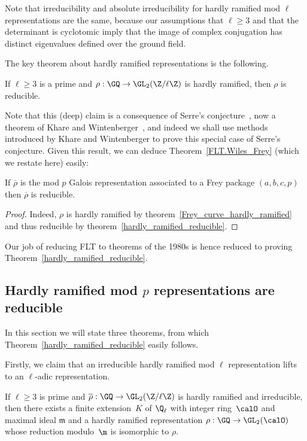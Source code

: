 Note that irreducibility and absolute irreducibility for hardly ramified mod $\ell$ representations
are the same, because our assumptions that $\ell\geq3$
and that the determinant is cyclotomic imply that the image of complex conjugation
has distinct eigenvalues defined over the ground field.

The key theorem about hardly ramified representations is the following.

\begin{theorem}
  \label{hardly_ramified_reducible}
  If $\ell\geq 3$ is a prime and $\rho:\GQ\to\GL_2(\Z/\ell\Z)$ is hardly ramified,
  then $\rho$ is reducible.
\end{theorem}

Note that this (deep) claim is a consequence of Serre's conjecture~\cite{serreconj},
now a theorem of Khare and Wintenberger~\cite{kwII}, and indeed we shall use
methods introduced by Khare and Wintenberger to prove this special case of
Serre's conjecture. Given this result, we can deduce Theorem~\ref{FLT.Wiles_Frey}
(which we restate here) easily:

\begin{theorem}
  \label{FLT.Wiles_Frey'}
  \leanok
  If $\overline{\rho}$ is the mod $p$ Galois representation associated to a Frey package $(a,b,c,p)$ then
  $\overline{\rho}$ is reducible.
\end{theorem}
\begin{proof}
  Indeed, $\rho$ is hardly ramified by theorem~\ref{Frey_curve_hardly_ramified}
  and thus reducible by theorem~\ref{hardly_ramified_reducible}.
\end{proof}

Our job of reducing FLT to theorems of the 1980s is hence reduced to proving
Theorem~\ref{hardly_ramified_reducible}.

\subsection{Hardly ramified mod $p$ representations are reducible}

In this section we will state three theorems, from which Theorem~\ref{hardly_ramified_reducible}
easily follows.

Firstly, we claim that
an irreducible hardly ramified mod $\ell$ representation lifts to an $\ell$-adic representation.

\begin{theorem}
  \label{hardly-ramified-lifts}
  If $\ell\geq3$ is prime and $\overline{\rho}:\GQ\to\GL_2(\Z/\ell\Z)$
  is hardly ramified and irreducible, then there exists a finite extension~$K$ of $\Q_\ell$
  with integer ring~$\calO$ and maximal ideal $\mathfrak{m}$
  and a hardly ramified representation
  $\rho:\GQ\to\GL_2(\calO)$ whose reduction modulo~$\m$ is isomorphic to $\rho$.
\end{theorem}

